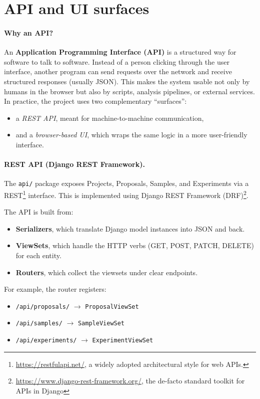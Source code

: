 \section{API and UI surfaces}\label{sec:api-ui}

\paragraph{Why an API?}
An \textbf{Application Programming Interface (API)} is a structured way for software to talk to software.  
Instead of a person clicking through the user interface, another program can send requests over the network 
and receive structured responses (usually JSON).  
This makes the system usable not only by humans in the browser but also by scripts, analysis pipelines, 
or external services.  
In practice, the project uses two complementary “surfaces”:
\begin{itemize}
	\item a \emph{REST API}, meant for machine-to-machine communication,  
	\item and a \emph{browser-based UI}, which wraps the same logic in a more user-friendly interface.  
\end{itemize}

\paragraph{REST API (Django REST Framework).}
The \texttt{api/} package exposes Projects, Proposals, Samples, and Experiments via a REST\footnote{\url{https://restfulapi.net/}, a widely adopted architectural style for web APIs.} interface.  
This is implemented using Django REST Framework (DRF)\footnote{\url{https://www.django-rest-framework.org/}, the de-facto standard toolkit for APIs in Django}.  

The API is built from:
\begin{itemize}
	\item \textbf{Serializers}, which translate Django model instances into JSON and back.  
	\item \textbf{ViewSets}, which handle the HTTP verbs (GET, POST, PATCH, DELETE) for each entity.  
	\item \textbf{Routers}, which collect the viewsets under clear endpoints.  
\end{itemize}

For example, the router registers:
\begin{itemize}
	\item \texttt{/api/proposals/} $\to$ \texttt{ProposalViewSet}  
	\item \texttt{/api/samples/} $\to$ \texttt{SampleViewSet}  
	\item \texttt{/api/experiments/} $\to$ \texttt{ExperimentViewSet}  
\end{itemize}

